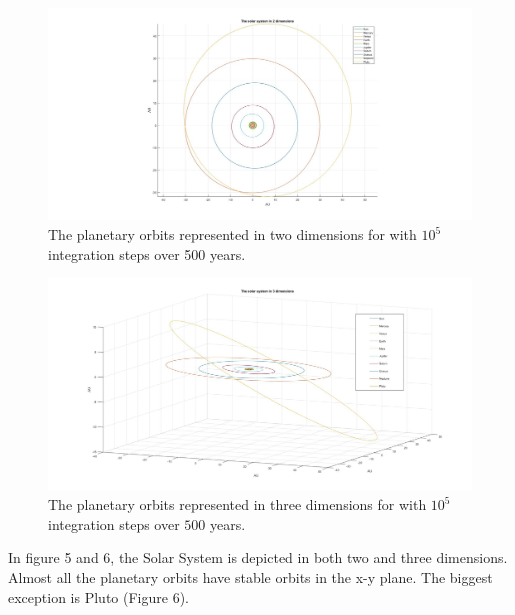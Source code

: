 \documentclass[10pt,a4paper]{article}
\begin{document}
\begin{figure} [H]  
\centerline{\includegraphics[scale=0.40]{2dsolsys.jpg}}
\caption{The planetary orbits represented in two dimensions for with $10^5$ integration steps over 500 years.}
\end{figure}



\begin{figure} [H]

\centerline{\includegraphics[scale=0.35]{3dsolsys.jpg}}
\caption{The planetary orbits represented in three dimensions for with $10^5$ integration steps over $500$ years.}

\end{figure}


In figure 5 and 6, the Solar System is depicted in both two and three dimensions. Almost all the planetary orbits have stable orbits in the x-y plane. The biggest exception is Pluto (Figure 6). 
\end{document}

